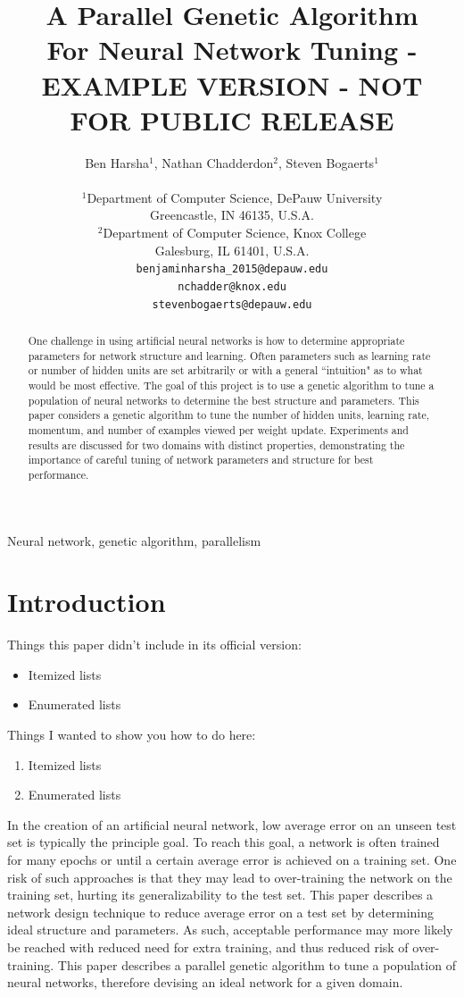 \documentclass[10pt, conference, compsocconf]{IEEEtran}
\title{A Parallel Genetic Algorithm \\For Neural Network Tuning - EXAMPLE VERSION - NOT FOR PUBLIC RELEASE}
\author{Ben Harsha$^1$, Nathan Chadderdon$^2$, Steven Bogaerts$^1$ \\
\\
$^1$Department of Computer Science, DePauw University\\
Greencastle, IN 46135, U.S.A.\\
$^2$Department of Computer Science, Knox College\\
Galesburg, IL 61401, U.S.A.\\
{\tt benjaminharsha\_2015@depauw.edu} \\
{\tt nchadder@knox.edu} \\
{\tt stevenbogaerts@depauw.edu}
}
\begin{document}
\maketitle

\begin{abstract}

One challenge in using artificial neural networks is how to determine appropriate parameters for network structure and learning. Often parameters such as learning rate or number of hidden units are set arbitrarily or with a general ``intuition" as to what would be most effective. The goal of this project is to use a genetic algorithm to tune a population of neural networks to determine the best structure and parameters. This paper considers a genetic algorithm to tune the number of hidden units, learning rate, momentum, and number of examples viewed per weight update. Experiments and results are discussed for two domains with distinct properties, demonstrating the importance of careful tuning of network parameters and structure for best performance.

\end{abstract}

 Neural network, genetic algorithm, parallelism

\section{Introduction}

Things this paper didn't include in its official version:
\begin{itemize}
\item Itemized lists
\item Enumerated lists
\end{itemize}

Things I wanted to show you how to do here:
\begin{enumerate}
\item Itemized lists
\item Enumerated lists
\end{enumerate}



In the creation of an artificial neural network, low average error on an unseen test set is typically the principle goal. To reach this goal, a network is often trained for many epochs or until a certain average error is achieved on a training set. One risk of such approaches is that they may lead to over-training the network on the training set, hurting its generalizability to the test set. This paper describes a network design technique to reduce average error on a test set by determining ideal structure and parameters. As such, acceptable performance may more likely be reached with reduced need for extra training, and thus reduced risk of over-training. This paper describes a parallel genetic algorithm to tune a population of neural networks, therefore devising an ideal network for a given domain.
\end{document}

